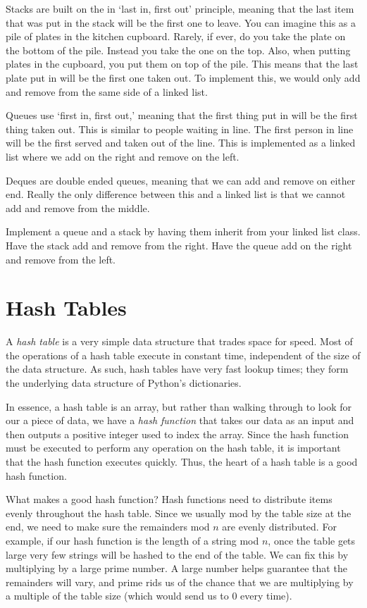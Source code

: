 Stacks are built on the in `last in, first out' principle, meaning that the last item that was put in the stack will be the first one to leave. You can imagine this as a pile of plates in the kitchen cupboard. Rarely, if ever, do you take the plate on the bottom of the pile. Instead you take the one on the top. Also, when putting plates in the cupboard, you put them on top of the pile. This means that the last plate put in will be the first one taken out. To implement this, we would only add and remove from the same side of a linked list.

Queues use `first in, first out,' meaning that the first thing put in will be the first thing taken out. This is similar to people waiting in line. The first person in line will be the first served and taken out of the line. This is implemented as a linked list where we add on the right and remove on the left.

Deques are double ended queues, meaning that we can add and remove on either end. Really the only difference between this and a linked list is that we cannot add and remove from the middle.

\begin{problem}
Implement a queue and a stack by having them inherit from your linked list class.
Have the stack add and remove from the right.
Have the queue add on the right and remove from the left.
\label{prob:Stack}
\end{problem}

\section*{Hash Tables}
A \emph{hash table} is a very simple data structure that trades space for speed.
Most of the operations of a hash table execute in constant time, independent of the size of the data structure.
As such, hash tables have very fast lookup times;  they form the underlying data structure of Python's dictionaries.

In essence, a hash table is an array, but rather than walking through to look for our a piece of data, we have a \emph{hash function} that takes our data as an input and then outputs a positive integer used to index the array.
Since the hash function must be executed to perform any operation on the hash table, it is important that the hash function executes quickly.
Thus, the heart of a hash table is a good hash function.

What makes a good hash function?
Hash functions need to distribute items evenly throughout the hash table.
Since we usually mod by the table size at the end, we need to make sure the remainders mod $n$ are evenly distributed.
For example, if our hash function is the length of a string mod $n$, once the table gets large very few strings will be hashed to the end of the table.
We can fix this by multiplying by a large prime number.
A large number helps guarantee that the remainders will vary, and prime rids us of the chance that we are multiplying by a multiple of the table size (which would send us to 0 every time).

